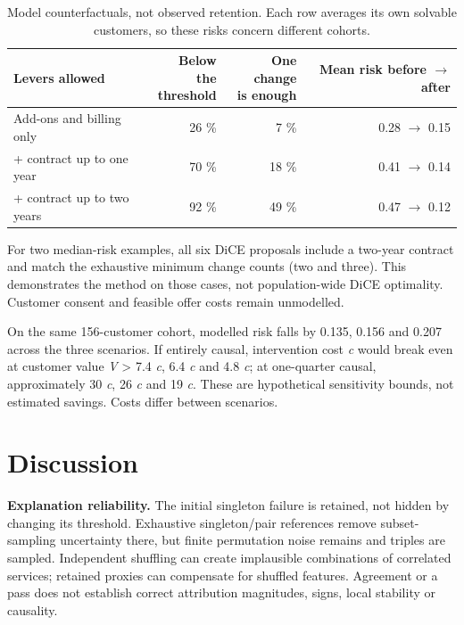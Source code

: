 \documentclass[10pt,a4paper]{article}
\begin{document}
\begin{table}[H]
\centering\small
\setlength{\tabcolsep}{4pt}
\begin{tabular*}{\linewidth}{@{\extracolsep{\fill}}lrrr@{}}
\toprule
Levers allowed & \shortstack[r]{Below the\\threshold} & \shortstack[r]{One change\\is enough} & \shortstack[r]{Mean risk\\before $\rightarrow$ after} \\
\midrule
Add-ons and billing only & 26 \% & 7 \% & 0.28 \ensuremath{\rightarrow} 0.15 \\
+ contract up to one year & 70 \% & 18 \% & 0.41 \ensuremath{\rightarrow} 0.14 \\
+ contract up to two years & 92 \% & 49 \% & 0.47 \ensuremath{\rightarrow} 0.12 \\
\bottomrule
\end{tabular*}
\caption{Model counterfactuals, not observed
retention. Each row averages its own solvable customers, so these risks
concern different cohorts.}
\label{tab:levers}
\end{table}

For two median-risk examples, all six DiCE proposals include a two-year
contract and match the exhaustive minimum change counts (two and three).
This demonstrates the method on those cases, not population-wide DiCE
optimality. Customer consent and feasible offer costs remain unmodelled.

On the same 156-customer cohort, modelled risk falls by 0.135, 0.156 and
0.207 across the three scenarios. If entirely causal, intervention cost
\emph{c} would break even at customer value \emph{V} \textgreater{} 7.4
\emph{c}, 6.4 \emph{c} and 4.8 \emph{c}; at one-quarter causal,
approximately 30 \emph{c}, 26 \emph{c} and 19 \emph{c}. These are
hypothetical sensitivity bounds, not estimated savings. Costs differ
between scenarios.

\section{Discussion}\label{discussion}

\textbf{Explanation reliability.} The initial singleton failure is
retained, not hidden by changing its threshold. Exhaustive
singleton/pair references remove subset-sampling uncertainty there, but
finite permutation noise remains and triples are sampled. Independent
shuffling can create implausible combinations of correlated services;
retained proxies can compensate for shuffled features. Agreement or a
pass does not establish correct attribution magnitudes, signs, local
stability or causality.
\end{document}
